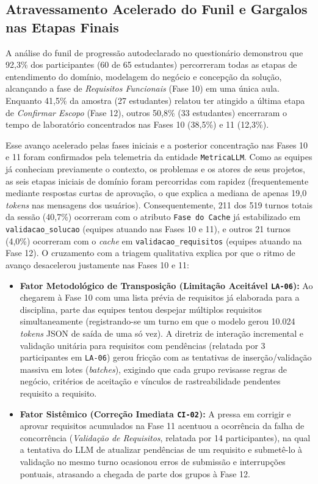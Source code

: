 \subsection{Atravessamento Acelerado do Funil e Gargalos nas Etapas Finais}

A análise do funil de progressão autodeclarado no questionário demonstrou que 92,3\% dos participantes (60 de 65 estudantes) percorreram todas as etapas de entendimento do domínio, modelagem do negócio e concepção da solução, alcançando a fase de \textit{Requisitos Funcionais} (Fase 10) em uma única aula. Enquanto 41,5\% da amostra (27 estudantes) relatou ter atingido a última etapa de \textit{Confirmar Escopo} (Fase 12), outros 50,8\% (33 estudantes) encerraram o tempo de laboratório concentrados nas Fases 10 (38,5\%) e 11 (12,3\%).

Esse avanço acelerado pelas fases iniciais e a posterior concentração nas Fases 10 e 11 foram confirmados pela telemetria da entidade \texttt{MetricaLLM}. Como as equipes já conheciam previamente o contexto, os problemas e os atores de seus projetos, as seis etapas iniciais de domínio foram percorridas com rapidez (frequentemente mediante respostas curtas de aprovação, o que explica a mediana de apenas 19,0 \textit{tokens} nas mensagens dos usuários). Consequentemente, 211 dos 519 turnos totais da sessão (40,7\%) ocorreram com o atributo \texttt{Fase do Cache} já estabilizado em \texttt{validacao\_solucao} (equipes atuando nas Fases 10 e 11), e outros 21 turnos (4,0\%) ocorreram com o \textit{cache} em \texttt{validacao\_requisitos} (equipes atuando na Fase 12). O cruzamento com a triagem qualitativa explica por que o ritmo de avanço desacelerou justamente nas Fases 10 e 11:

\begin{itemize}
    \item \textbf{Fator Metodológico de Transposição (Limitação Aceitável \texttt{LA-06}):} Ao chegarem à Fase 10 com uma lista prévia de requisitos já elaborada para a disciplina, parte das equipes tentou despejar múltiplos requisitos simultaneamente (registrando-se um turno em que o modelo gerou 10.024 \textit{tokens} JSON de saída de uma só vez). A diretriz de interação incremental e validação unitária para requisitos com pendências (relatada por 3 participantes em \texttt{LA-06}) gerou fricção com as tentativas de inserção/validação massiva em lotes (\textit{batches}), exigindo que cada grupo revisasse regras de negócio, critérios de aceitação e vínculos de rastreabilidade pendentes requisito a requisito.
    \item \textbf{Fator Sistêmico (Correção Imediata \texttt{CI-02}):} A pressa em corrigir e aprovar requisitos acumulados na Fase 11 acentuou a ocorrência da falha de concorrência (\textit{Validação de Requisitos}, relatada por 14 participantes), na qual a tentativa do LLM de atualizar pendências de um requisito e submetê-lo à validação no mesmo turno ocasionou erros de submissão e interrupções pontuais, atrasando a chegada de parte dos grupos à Fase 12.
\end{itemize}

